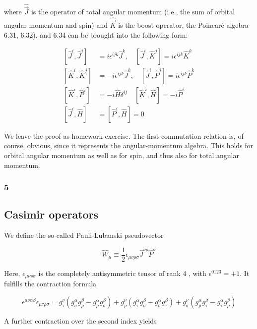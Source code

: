 \documentclass[10pt, letterpaper]{article}
\begin{document}
where $\hat{\vec{J}}$ is the operator of total angular momentum (i.e., the sum of orbital angular momentum and spin) and $\hat{\vec{K}}$ is the boost operator, the Poincaré algebra 6.31, 6.32), and 6.34 can be brought into the following form:

$$
\begin{aligned}
{\left[\hat{J}^{i}, \hat{J}^{j}\right] } & =i \epsilon^{i j k} \hat{J}^{k}, \quad\left[\hat{J}^{i}, \hat{K}^{j}\right]=i \epsilon^{i j k} \hat{K}^{k} \\
{\left[\hat{K}^{i}, \hat{K}^{j}\right] } & =-i \epsilon^{i j k} \hat{J}^{k}, \quad\left[\hat{J}^{i}, \hat{P}^{j}\right]=i \epsilon^{i j k} \hat{P}^{k} \\
{\left[\hat{K}^{i}, \hat{P}^{j}\right] } & =-i \hat{H} \delta^{i j} \quad\left[\hat{K}^{i}, \hat{H}\right]=-i \hat{P}^{i} \\
{\left[\hat{J}^{i}, \hat{H}\right] } & =\left[\hat{P}^{i}, \hat{H}\right]=0
\end{aligned}
$$

We leave the proof as homework exercise. The first commutation relation is, of course, obvious, since it represents the angular-momentum algebra. This holds for orbital angular momentum as well as for spin, and thus also for total angular momentum.

\subsubsection{5}
\subsection{Casimir operators}
We define the so-called Pauli-Lubanski pseudovector

$$
\hat{W}_{\mu} \equiv \frac{1}{2} \epsilon_{\mu \nu \rho \sigma} \hat{J}^{\nu \rho} \hat{P}^{\sigma}
$$

Here, $\epsilon_{\mu \nu \rho \sigma}$ is the completely antisymmetric tensor of rank 4 , with $\epsilon^{0123}=+1$. It fulfills the contraction formula

$$
\epsilon^{\mu \nu \alpha \beta} \epsilon_{\mu \tau \rho \sigma}=g_{\tau}^{\nu}\left(g_{\sigma}^{\alpha} g_{\rho}^{\beta}-g_{\rho}^{\alpha} g_{\sigma}^{\beta}\right)+g_{\rho}^{\nu}\left(g_{\tau}^{\alpha} g_{\sigma}^{\beta}-g_{\sigma}^{\alpha} g_{\tau}^{\beta}\right)+g_{\sigma}^{\nu}\left(g_{\rho}^{\alpha} g_{\tau}^{\beta}-g_{\tau}^{\alpha} g_{\rho}^{\beta}\right)
$$

A further contraction over the second index yields
\end{document}
